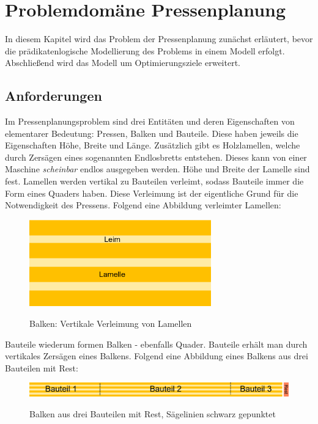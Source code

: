 \chapter{Problemdomäne Pressenplanung}
\label{chapter:problem}
In diesem Kapitel wird das Problem der Pressenplanung zunächst erläutert,
bevor die prädikatenlogische Modellierung des Problems in einem Modell erfolgt.
Abschließend wird das Modell um Optimierungsziele erweitert.

\section{Anforderungen}
\label{sec:anforderungen}
Im Pressenplanungsproblem sind drei Entitäten und deren Eigenschaften von elementarer Bedeutung: Pressen, Balken und Bauteile.
Diese haben jeweils die Eigenschaften Höhe, Breite und Länge.
Zusätzlich gibt es Holzlamellen, welche durch Zersägen eines sogenannten Endlosbretts entstehen.
Dieses kann von einer Maschine \textit{scheinbar} endlos ausgegeben werden.
Höhe und Breite der Lamelle sind fest.
Lamellen werden vertikal zu Bauteilen verleimt, sodass Bauteile immer die Form eines Quaders haben.
Diese Verleimung ist der eigentliche Grund für die Notwendigkeit des Pressens.
Folgend eine Abbildung verleimter Lamellen:

\begin{figure}[h]
    \centering
    \includegraphics[width=0.70\textwidth, center]{Images/LammelleLeim}\\
    \caption{Balken: Vertikale Verleimung von Lamellen}
    \label{figure:lamelleleim}
\end{figure}

Bauteile wiederum formen Balken - ebenfalls Quader.
Bauteile erhält man durch vertikales Zersägen eines Balkens.
Folgend eine Abbildung eines Balkens aus drei Bauteilen mit Rest:

\begin{figure}[h]
    \centering
    \includegraphics[width=1.00\textwidth, center]{Images/BalkenBauteileRest}\\
    \caption{Balken aus drei Bauteilen mit Rest, Sägelinien schwarz gepunktet}
    \label{figure:balkenbauteilerest}
\end{figure}

